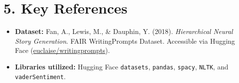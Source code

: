 \documentclass[12pt, a4paper]{article}
\begin{document}
\section*{5. Key References}
\begin{itemize}[topsep=0pt,itemsep=-1ex,partopsep=1ex,parsep=1ex]
    \item \textbf{Dataset:} Fan, A., Lewis, M., \& Dauphin, Y. (2018). \textit{Hierarchical Neural Story Generation}. FAIR WritingPrompts Dataset. Accessible via Hugging Face (\href{https://huggingface.co/datasets/euclaise/writingprompts}{euclaise/writingprompts}).
    \item \textbf{Libraries utilized:} Hugging Face \texttt{datasets}, \texttt{pandas}, \texttt{spacy}, \texttt{NLTK}, and \texttt{vaderSentiment}.
\end{itemize}
\end{document}
